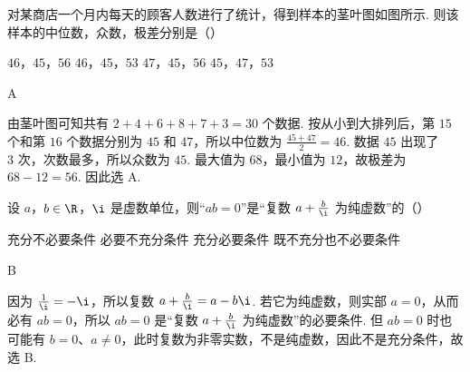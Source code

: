 \begin{problem}
对某商店一个月内每天的顾客人数进行了统计，得到样本的茎叶图如图所示. 则该样本的中位数，众数，极差分别是（\quad）



\choices
    {\(46\)，\(45\)，\(56\)}
    {\(46\)，\(45\)，\(53\)}
    {\(47\)，\(45\)，\(56\)}
    {\(45\)，\(47\)，\(53\)}
\end{problem}

\begin{answer}
A
\end{answer}

\begin{solution}
由茎叶图可知共有 \(2+4+6+8+7+3=30\) 个数据. 按从小到大排列后，第 \(15\) 个和第 \(16\) 个数据分别为 \(45\) 和 \(47\)，所以中位数为 \(\frac{45+47}{2}=46\). 数据 \(45\) 出现了 \(3\text{ 次}\)，次数最多，所以众数为 \(45\). 最大值为 \(68\)，最小值为 \(12\)，故极差为 \(68-12=56\). 因此选 A.
\end{solution}

\begin{problem}
设 \(a\)，\(b \in \R\)，\(\i\) 是虚数单位，则“\(ab = 0\)”是“复数 \(a + \frac{b}{\i}\) 为纯虚数”的（\quad）

\choices
    {充分不必要条件}
    {必要不充分条件}
    {充分必要条件}
    {既不充分也不必要条件}
\end{problem}

\begin{answer}
B
\end{answer}

\begin{solution}
因为 \(\frac{1}{\i}=-\i\)，所以复数 \(a+\frac{b}{\i}=a-b\i\). 若它为纯虚数，则实部 \(a=0\)，从而必有 \(ab=0\)，所以 \(ab=0\) 是“复数 \(a+\frac{b}{\i}\) 为纯虚数”的必要条件. 但 \(ab=0\) 时也可能有 \(b=0\)、\(a\ne0\)，此时复数为非零实数，不是纯虚数，因此不是充分条件，故选 B.
\end{solution}

